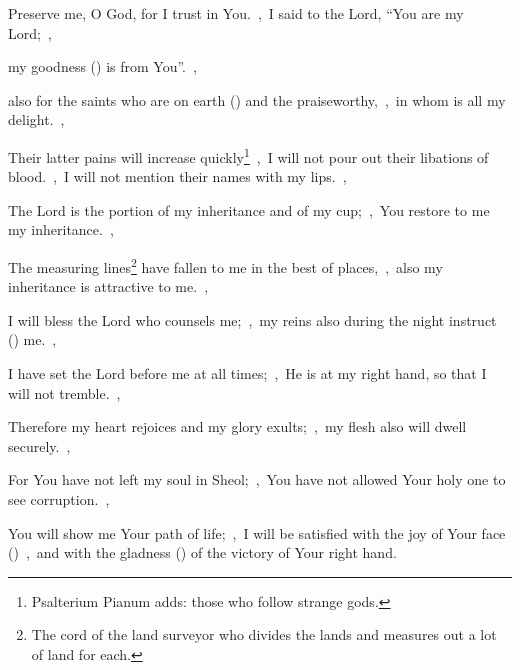 \documentclass[12pt,twoside,a5paper]{article}
\begin{document}

\begin{normalparskip}
  Preserve me, O God, for I trust in You.~\sep\ I said to the Lord, ``You are my Lord;~\sep


  my goodness () is from You''.~\sep

  also for the saints who are on earth () and the praiseworthy,~\sep\ in whom is all my delight.~\sep

  Their latter pains will increase quickly\footnote{Psalterium Pianum adds: those who follow strange gods.}~\sep\ I will not pour out their libations of blood.~\sep\ I will not mention their names with my lips.~\sep

  The Lord is the portion of my inheritance and of my cup;~\sep\ You restore to me my inheritance.~\sep

  The measuring lines\footnote{The cord of the land surveyor who divides the lands and measures out a lot of land for each.} have fallen to me in the best of places,~\sep\ also my inheritance is attractive to me.~\sep

  I will bless the Lord who counsels me;~\sep\ my reins also during the night instruct () me.~\sep

  I have set the Lord before me at all times;~\sep\ He is at my right hand, so that I will not tremble.~\sep

  Therefore my heart rejoices and my glory exults;~\sep\ my flesh also will dwell securely.~\sep

  For You have not left my soul in Sheol;~\sep\ You have not allowed Your holy one to see corruption.~\sep

  You will show me Your path of life;~\sep\ I will be satisfied with the joy of Your face ()~\sep\ and with the gladness () of the victory of Your right hand.
\end{normalparskip}

\end{document}
